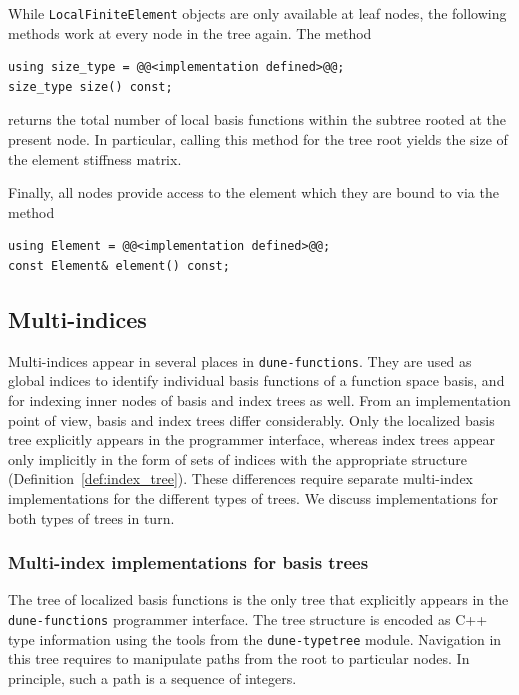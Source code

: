 \documentclass[a4paper,10pt,headings=normal,bibliography=totoc]{scrartcl}
\newcommand{\cpp}[1]{\lstinline[basicstyle=\ttfamily]!#1!}
\newcommand{\dunemodule}[1]{\texttt{#1}}
\begin{document}
While \cpp{LocalFiniteElement} objects are only available at leaf nodes,
the following methods work at every node in the tree again.
The method
\begin{lstlisting}[style=Interface]
using size_type = @@<implementation defined>@@;
size_type size() const;
\end{lstlisting}
returns the total number of
local basis functions within the subtree rooted at the
present node.  In particular, calling this method for the tree root
yields the size of the element stiffness matrix.

Finally, all nodes provide access to the
element which they are bound
to via the method
\begin{lstlisting}[style=Interface]
using Element = @@<implementation defined>@@;
const Element& element() const;
\end{lstlisting}



\subsection{Multi-indices}
\label{sec:multi_indices}
Multi-indices appear in several places in \dunemodule{dune-functions}.
They are used as global indices to identify individual
basis functions of a function space basis, and for indexing
inner nodes of basis and index trees as well.
From an implementation point of view, basis and index trees differ
considerably. Only the localized basis tree explicitly appears
in the programmer interface, whereas index trees appear only implicitly
in the form of sets of indices with the appropriate structure (Definition~\ref{def:index_tree}).
These differences require separate multi-index
implementations for the different types of trees.  We discuss implementations
for both types of trees in turn.

\subsubsection{Multi-index implementations for basis trees}

The tree of localized basis functions is the only tree that explicitly appears
in the \dunemodule{dune-functions} programmer interface. The tree structure
is encoded as C++ type information using the tools from the \dunemodule{dune-typetree}
module. Navigation in this tree requires to manipulate paths from the root to
particular nodes.  In principle, such a path is a sequence of integers.
\end{document}
